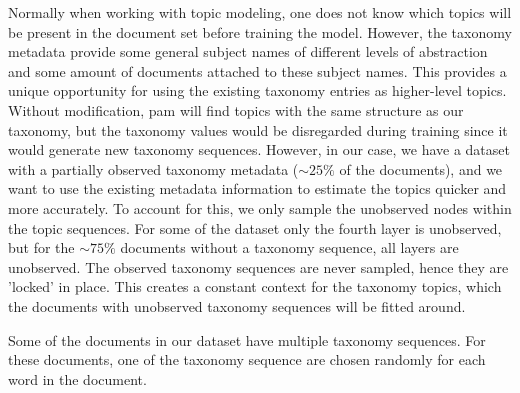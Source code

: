 




Normally when working with topic modeling, one does not know which topics will be present in the document set before training the model.
However, the taxonomy metadata provide some general subject names of different levels of abstraction and some amount of documents attached to these subject names.
This provides a unique opportunity for using the existing taxonomy entries as higher-level topics.
Without modification, \gls{pam} will find topics with the same structure as our taxonomy, but the taxonomy values would be disregarded during training since it would generate new taxonomy sequences.
However, in our case, we have a dataset with a partially observed taxonomy metadata (${\sim}25\%$ of the documents), and we want to use the existing metadata information to estimate the topics quicker and more accurately.
To account for this, we only sample the unobserved nodes within the topic sequences.
For some of the dataset only the fourth layer is unobserved, but for the ${\sim}75\%$ documents without a taxonomy sequence, all layers are unobserved.
The observed taxonomy sequences are never sampled, hence they are 'locked' in place.
This creates a constant context for the taxonomy topics, which the documents with unobserved taxonomy sequences will be fitted around.

Some of the documents in our dataset have multiple taxonomy sequences.
For these documents, one of the taxonomy sequence are chosen randomly for each word in the document. 
